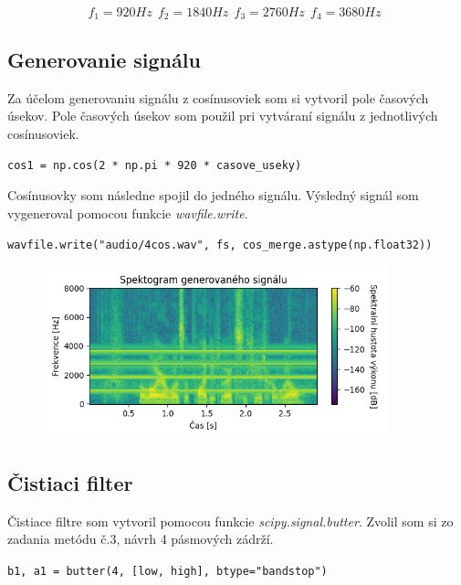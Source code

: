 \documentclass[a4paper,oneside]{article}
\begin{document}
    \[f_{1}= 920Hz\ \ f_{2}= 1840Hz\ \ f_{3}= 2760Hz\ \ f_{4}= 3680 Hz\ \ \]
	
	\subsection{Generovanie signálu}
	
	Za účelom generovaniu signálu z cosínusoviek som si vytvoril pole časových úsekov. Pole časových úsekov som použil pri vytváraní signálu z jednotlivých cosínusoviek. 
	
	\begin{center}
	        \verb|cos1 = np.cos(2 * np.pi * 920 * casove_useky)|\\
	 \end{center}
	 
	 Cosínusovky som následne spojil do jedného signálu. Výsledný signál som vygeneroval pomocou funkcie \textit{wavfile.write}.
	 
	 \begin{center}
	 \verb|wavfile.write("audio/4cos.wav", fs, cos_merge.astype(np.float32))|
    \end{center}
	
	\begin{figure}[h]
	    \begin{center}
		    \includegraphics[width=10cm,keepaspectratio]{uloha4-6.png}
		\end{center}
	\end{figure}
	
	
	\subsection{Čistiaci filter}
	
	Čistiace filtre som vytvoril pomocou funkcie \textit{scipy.signal.butter}. Zvolil som si zo zadania metódu č.3, návrh 4 pásmových zádrží. 
	
	\begin{center}
	       \verb|b1, a1 = butter(4, [low, high], btype="bandstop")|
    \end{center}
	
\end{document}
